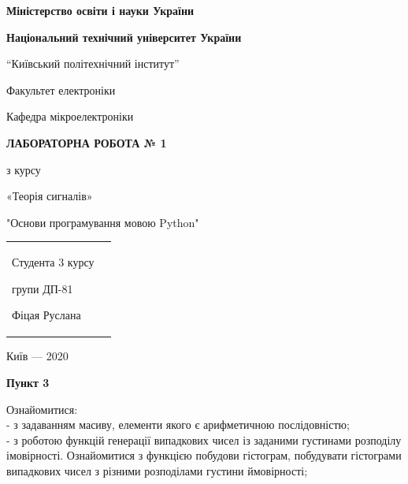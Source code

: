 \documentclass[a4paper,12pt]{article}
\begin{document}
\pagecolor{white}
\pagestyle{plain}
\begin{center}
   \begin{center} 
   \large{\textbf{Міністерство освіти і науки України} \par 
   \textbf{Національний технічний університет України}}\par
	“Київський політехнічний інститут”\par
	 Факультет електроніки\par
    	Кафедра мікроелектроніки\par
    \end{center}
    \vspace{4cm}
    
   	{\bfseries ЛАБОРАТОРНА РОБОТА № 1\par}
        \vspace{1cm}
        \large
        {
    	з курсу\par
    	«Теорія сигналів» \par
      	"Основи програмування мовою Python" \par  
	}
	\end{center}

       \vspace{7cm}
       \begin{tabularx}{\textwidth}{Xr}
        \flushright
           \begin{large} 
        Студента 3 курсу\par
 	групи ДП-81\par
	Фіцая Руслана\par
	 \end{large}
	\end{tabularx}
   
   \vfill
   \begin{center}
    {Київ} --- 2020
    \end{center}
 \newpage   

\begin{center}
\textbf{Пункт 3}\par
\end{center}
Ознайомитися:\\
- з задаванням масиву, елементи якого є арифметичною послідовністю;\\
- з роботою функцій генерації випадкових чисел із заданими густинами розподілу імовірності. Ознайомитися з функцією побудови гістограм, побудувати гістограми випадкових чисел з різними розподілами густини ймовірності;\\
\end{document}
